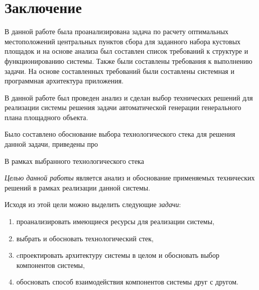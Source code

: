 \section*{\Large{Заключение}}
В данной работе была проанализирована задача по
расчету оптимальных местоположений центральных пунктов сбора
для заданного набора кустовых площадок и на основе анализа
был составлен список требований к структуре и функционированию системы.
Также были составлены требования к выполнению задачи.
На основе составленных требований были составлены системная и программная архитектура приложения.


В данной работе был проведен анализ и сделан выбор технических решений для реализации системы
решения задачи автоматической генерации генерального плана площадного объекта.

Было составлено обоснование выбора технологического стека для решения данной задачи, приведены про

В рамках выбранного технологического стека


\textit{Целью данной работы} является анализ и обоснование применяемых технических решений в рамках реализации данной
системы.

Исходя из этой цели можно выделить следующие \textit{задачи}:
\begin{enumerate}
    \item проанализировать имеющиеся ресурсы для реализации системы,
    \item выбрать и обосновать технологический стек,
    \item cпроектировать архитектуру системы в целом и обосновать выбор компонентов системы,
    \item обосновать способ взаимодействия компонентов системы друг с другом.
\end{enumerate}